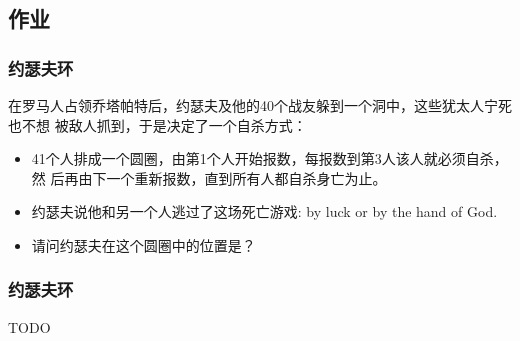 \subsection{作业}
\begin{frame}[fragile]
  \frametitle{约瑟夫环}

  在罗马人占领乔塔帕特后，约瑟夫及他的40个战友躲到一个洞中，这些犹太人宁死也不想
  被敌人抓到，于是决定了一个自杀方式：

  \begin{itemize}
    \item 41个人排成一个圆圈，由第1个人开始报数，每报数到第3人该人就必须自杀，然
      后再由下一个重新报数，直到所有人都自杀身亡为止。
  \item 约瑟夫说他和另一个人逃过了这场死亡游戏: by luck or by the hand of God.
  \item 请问约瑟夫在这个圆圈中的位置是？
  \end{itemize}
\end{frame}

\begin{frame}[fragile]
  \frametitle{约瑟夫环}

  TODO

\end{frame}
